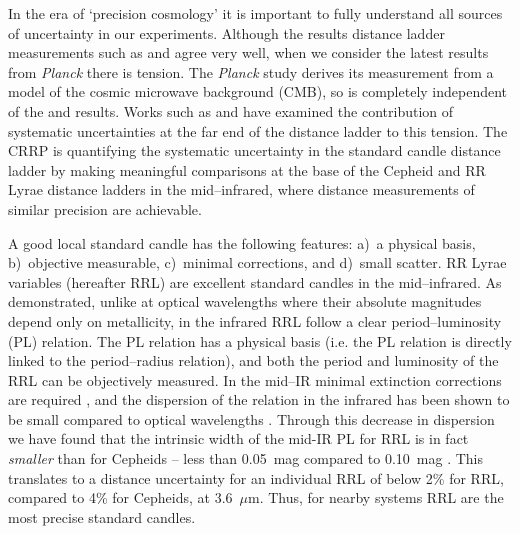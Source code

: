 \documentclass[a4paper,fleqn,usenatbib]{mnras}
\begin{document}
In the era of `precision cosmology' it is important to fully understand all sources of uncertainty in our experiments. Although the results distance ladder measurements such as \citet{2011ApJ...730..119R} and \citet{2012ApJ...758...24F} agree very well, 
when we consider the latest results from {\it Planck} 
 there is tension. The {\it Planck} study derives its measurement from a model of the cosmic microwave background (CMB), so is completely independent of the \citeauthor{2011ApJ...730..119R} and \citeauthor{2012ApJ...758...24F} results. Works such as \citet{2015ApJ...802...20R} and \citet{2014MNRAS.440.1138E} have examined the contribution of systematic uncertainties at the far end of the distance ladder to this tension. The CRRP is quantifying the systematic uncertainty in the standard candle distance ladder by making meaningful comparisons at the base of the Cepheid and RR Lyrae distance ladders in the mid--infrared, where distance measurements of similar precision are achievable. 

A good local standard candle \citep[as defined by][]{1986ApJ...303....1A} has the following  features: a)~a physical basis, b)~objective measurable, c)~minimal corrections, and d)~small scatter. RR Lyrae variables (hereafter RRL) are excellent standard candles in the mid--infrared. As \citet{1986MNRAS.220..279L} demonstrated, unlike at optical wavelengths where their absolute magnitudes depend only on metallicity, in the infrared RRL follow a clear period--luminosity (PL) relation. The PL relation has a physical basis (i.e. the PL relation is directly linked to the period--radius relation), and both the period and luminosity of the RRL can be objectively measured. In the mid--IR minimal extinction corrections are required \citep[$A_{[3.6]} \approx A_{V}/16$,][]{2005ApJ...619..931I}, and the dispersion of the relation in the infrared has been shown to be small compared to optical wavelengths \citep{2015ApJ...808...50M, 2004ApJS..154..633C}. Through this decrease in dispersion we have found that the intrinsic width of the mid-IR PL for RRL is in fact \emph{smaller} than for Cepheids -- less than 0.05~mag compared to 0.10~mag \citep{2015ApJ...808...11N, 2011ApJ...743...76S}. This translates to a distance uncertainty for an individual RRL of below 2\% for RRL, compared to 4\% for Cepheids, at 3.6~$\mu$m. Thus, for nearby systems RRL are the most precise standard candles.
\end{document}
